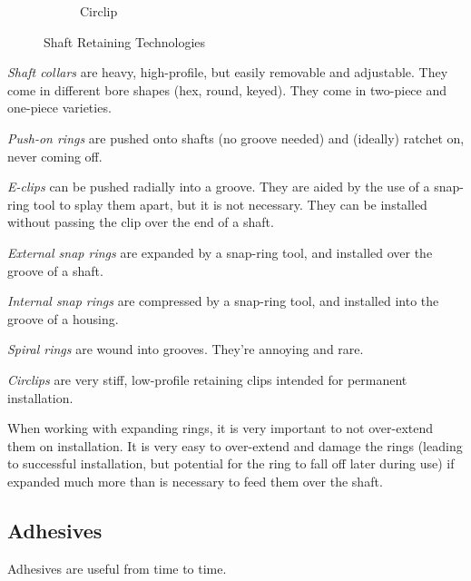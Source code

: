 \documentclass[10pt,letterpaper]{book}
\begin{document}
\begin{figure}[H]
\begin{subfigure}[b]{.24\linewidth}
			\caption{Circlip}
		\end{subfigure}
		\caption{Shaft Retaining Technologies}
	\end{figure}
	
	
	\begin{asparaenum}[a)]
		\item \textit{Shaft collars} are heavy, high-profile, but easily removable and adjustable. They come in different bore shapes (hex, round, keyed). They come in two-piece and one-piece varieties.
		\item \textit{Push-on rings} are pushed onto shafts (no groove needed) and (ideally) ratchet on, never coming off.
		\item \textit{E-clips} can be pushed radially into a groove. They are aided by the use of a snap-ring tool to splay them apart, but it is not necessary. They can be installed without passing the clip over the end of a shaft.
		\item \textit{External snap rings} are expanded by a snap-ring tool, and installed over the groove of a shaft.
		\item \textit{Internal snap rings} are compressed by a snap-ring tool, and installed into the groove of a housing.
		\item \textit{Spiral rings} are wound into grooves. They're annoying and rare.
		\item \textit{Circlips} are very stiff, low-profile retaining clips intended for permanent installation.

	\end{asparaenum}
	
	When working with expanding rings, it is very important to not over-extend them on installation. It is very easy to over-extend and damage the rings (leading to successful installation, but potential for the ring to fall off later during use) if expanded much more than is necessary to feed them over the shaft.
	
	\subsection{Adhesives}
	
	Adhesives are useful from time to time.
	
\end{document}
